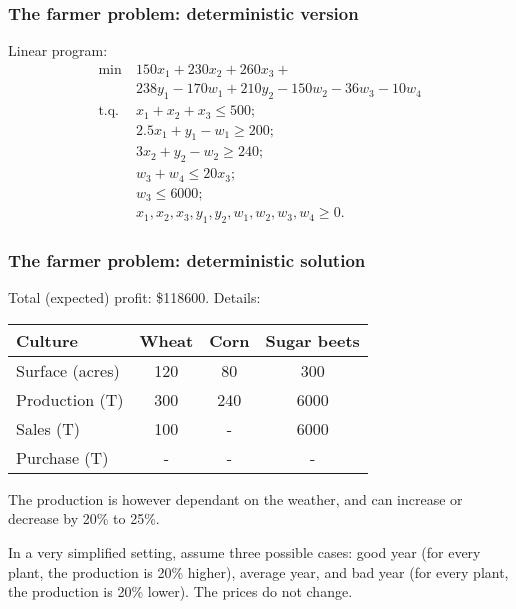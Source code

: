 \documentclass{beamer}
\begin{document}
\begin{frame}
\frametitle{The farmer problem: deterministic version}

Linear program:
\begin{align*}
\min\ & 150x_1 + 230x_2 + 260x_3 +\\
&  238y_1 - 170w_1 + 210y_2 - 150w_2 -36w_3 - 10w_4 \\
\text{t.q. } & x_1 + x_2 + x_3 \leq 500; \\
& 2.5x_1 + y_1 - w_1 \geq 200; \\
& 3x_2 + y_2 - w_2 \geq 240; \\
& w_3 + w_4 \leq 20 x_3; \\
& w_3 \leq 6000; \\
& x_1, x_2, x_3, y_1, y_2, w_1, w_2, w_3, w_4 \geq 0.
\end{align*}

\end{frame}

\begin{frame}
\frametitle{The farmer problem: deterministic solution}

Total (expected) profit: \$118600. Details:
\begin{center}
\begin{tabular}{lccc}
\hline
Culture & Wheat & Corn & Sugar beets \\
\hline
Surface (acres) & 120 & 80 & 300 \\
Production (T) & 300 & 240 & 6000 \\
Sales (T) & 100 & - & 6000 \\
Purchase (T) & - & - & - \\
\hline
\end{tabular}
\end{center}

\mbox{}

The production is however dependant on the weather, and can increase or decrease by 20\% to 25\%.

\mbox{}

In a very simplified setting, assume three possible cases: good year (for every plant, the production is 20\% higher), average year, and bad year (for every plant, the production is 20\% lower).
The prices do not change.
\end{frame}
\end{document}
